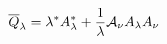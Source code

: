 \begin{equation}
\overline{Q}_\lambda= \lambda^* A_\lambda^* +\frac{1}{\lambda} {\cal{A}}_\nu A_\lambda A_\nu
\end{equation}

